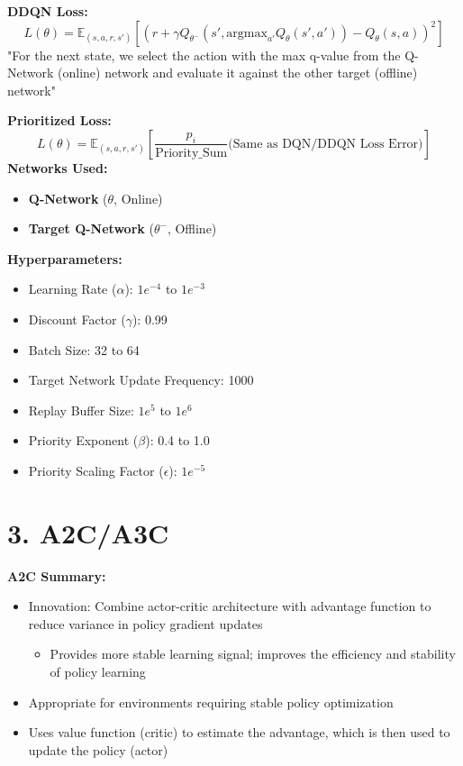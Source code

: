 \documentclass[a4paper,10pt]{article}
\begin{document}
\begin{multicols}{2}
\noindent \textbf{DDQN Loss:}
\[
L(\theta) = \mathbb{E}_{(s, a, r, s')} \left[ \left( r + \gamma Q_{\theta^-}(s', \text{argmax}_{a'} Q_\theta(s', a')) - Q_\theta(s, a) \right)^2 \right]
\]
"For the next state, we select the action with the max q-value from the Q-Network (online) network and evaluate it against the other target (offline) network"

\noindent \textbf{Prioritized Loss:}
\[
L(\theta) = \mathbb{E}_{(s, a, r, s')} \left[ \frac{p_i}{\text{Priority\_Sum}} \text{(Same as DQN/DDQN Loss Error)} \right]
\]
\textbf{Networks Used:} 
\begin{itemize}
    \item \textbf{Q-Network} (\(\theta\), Online)
    \item \textbf{Target Q-Network} (\(\theta^-\), Offline)
\end{itemize}
\textbf{Hyperparameters:}
\begin{itemize}
    \item Learning Rate (\(\alpha\)): \(1e^{-4}\) to \(1e^{-3}\)
    \item Discount Factor (\(\gamma\)): 0.99
    \item Batch Size: 32 to 64
    \item Target Network Update Frequency: 1000
    \item Replay Buffer Size: \(1e^5\) to \(1e^6\)
    \item Priority Exponent (\(\beta\)): 0.4 to 1.0
    \item Priority Scaling Factor (\(\epsilon\)): \(1e^{-5}\)
\end{itemize}

\section*{3. A2C/A3C}
\textbf{A2C Summary:}
\begin{itemize}
    \item Innovation: Combine actor-critic architecture with advantage function to reduce variance in policy gradient updates
    \begin{itemize}
        \item Provides more stable learning signal; improves the efficiency and stability of policy learning
    \end{itemize}
    \item Appropriate for environments requiring stable policy optimization
    \item Uses value function (critic) to estimate the advantage, which is then used to update the policy (actor)
\end{itemize}


\end{multicols}
\end{document}
